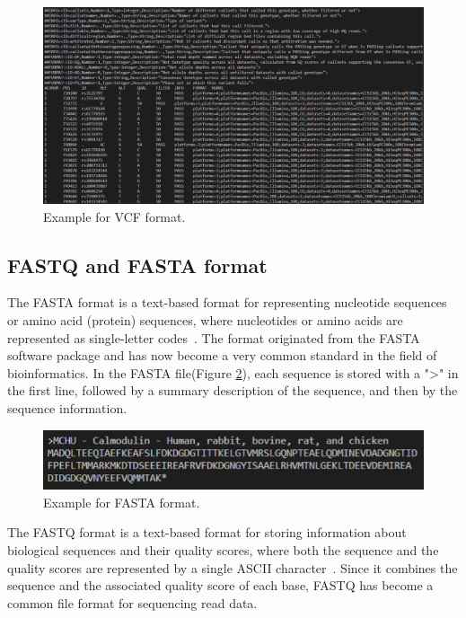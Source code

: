 \documentclass[PhD]{PHlab-thesis}
\begin{document}
\begin{figure}[h!]
	\centering
	\includegraphics[scale=0.3]{figures/Example for VCF file.png}
	\caption{Example for VCF format.}
	\label{fig:VCF format} %
\end{figure}

\subsection{FASTQ and FASTA format}
The FASTA format is a text-based format for representing nucleotide sequences or amino acid (protein) sequences, where nucleotides or amino acids are represented as single-letter codes~\cite{Lipman1985FASTA}. The format originated from the FASTA software package and has now become a very common standard in the field of bioinformatics. In the FASTA file(Figure \ref{fig:FASTA format}), each sequence is stored with a ">" in the first line, followed by a summary description of the sequence, and then by the sequence information.

\begin{figure}[h!]
	\centering
	\includegraphics[scale=0.4]{figures/Example for FASTA format.png}
	\caption{Example for FASTA format.}
	\label{fig:FASTA format} %
\end{figure}

The FASTQ format is a text-based format for storing information about biological sequences and their quality scores, where both the sequence and the quality scores are represented by a single ASCII character~\cite{Cock2010FASTQ}. Since it combines the sequence and the associated quality score of each base, FASTQ has become a common file format for sequencing read data.
\end{document}
